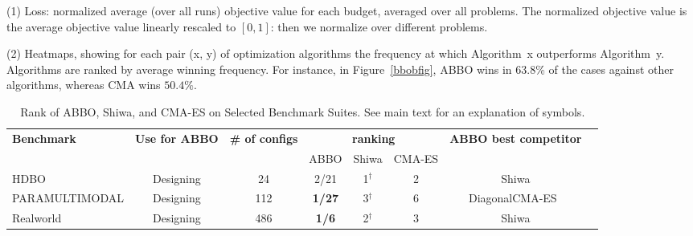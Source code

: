 (1) Loss: normalized average (over all runs) objective value for each budget, averaged over all problems. The normalized objective value is the average objective value linearly rescaled to $[0,1]$: then we normalize over different problems.

    (2) Heatmaps, showing for each pair (x, y) of optimization algorithms the frequency at which Algorithm~x outperforms Algorithm~y. Algorithms are ranked by average winning frequency. {For instance, in Figure~\ref{bbobfig}, ABBO wins in 63.8\% of the cases against other algorithms, whereas CMA wins $50.4\%$.}

  \begin{table}[t]
  	    \caption{Rank of ABBO, Shiwa, and CMA-ES on Selected Benchmark Suites. See main text for an explanation of symbols.}
	        \label{bigtable}
        \centering
       \setlength{\tabcolsep}{1pt}
       \scriptsize
{\begin{tabular}{|l|c|c|c|c|c|c|c|}
		\hline
        \textbf{Benchmark} &\textbf{Use for ABBO}& \textbf{\# of configs}& \multicolumn{3}{|c|}{\textbf{ranking}} & \textbf{ABBO  best competitor} \\
         & & & ABBO & Shiwa  & CMA-ES & \\
        \hline 		  \hline
         HDBO& Designing & 24 & {2/21} &1$^\dagger$ &2  & {Shiwa}  \\ \hline
        PARAMULTIMODAL & Designing& 112 & \textbf{1/27} &  3$^\dagger$ & 6 & {DiagonalCMA-ES}~\cite{diagcma} \\ \hline
        Realworld& Designing & 486 & \textbf{1/6} &  2$^\dagger$ & 3 & Shiwa \\ \hline


\end{tabular}}
\end{table}
